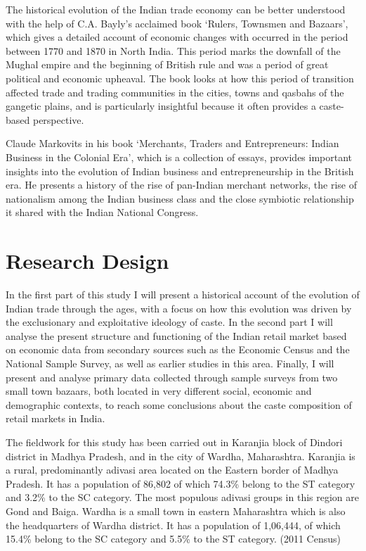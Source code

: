 \documentclass[12pt,a4paper,titlepage]{report}
\begin{document}
The historical evolution of the Indian trade economy can be better
understood with the help of C.A. Bayly's acclaimed book `Rulers,
Townsmen and Bazaars', which gives a detailed account of economic
changes with occurred in the period between 1770 and 1870 in North
India. This period marks the downfall of the Mughal empire and the
beginning of British rule and was a period of great political and
economic upheaval. The book looks at how this period of transition
affected trade and trading communities in the cities, towns and qasbahs
of the gangetic plains, and is particularly insightful because it often
provides a caste-based perspective.

Claude Markovits in his book `Merchants, Traders and Entrepreneurs:
Indian Business in the Colonial Era', which is a collection of essays,
provides important insights into the evolution of Indian business and
entrepreneurship in the British era. He presents a history of the rise
of pan-Indian merchant networks, the rise of nationalism among the
Indian business class and the close symbiotic relationship it shared
with the Indian National Congress.

\section{Research Design}\label{research-design}

In the first part of this study I will present a historical account of
the evolution of Indian trade through the ages, with a focus on how this
evolution was driven by the exclusionary and exploitative ideology of
caste. In the second part I will analyse the present structure and
functioning of the Indian retail market based on economic data from
secondary sources such as the Economic Census and the National Sample
Survey, as well as earlier studies in this area. Finally, I will present
and analyse primary data collected through sample surveys from two small
town bazaars, both located in very different social, economic and
demographic contexts, to reach some conclusions about the caste
composition of retail markets in India.

The fieldwork for this study has been carried out in Karanjia block of
Dindori district in Madhya Pradesh, and in the city of Wardha,
Maharashtra. Karanjia is a rural, predominantly adivasi area located on
the Eastern border of Madhya Pradesh. It has a population of 86,802 of
which 74.3\% belong to the ST category and 3.2\% to the SC category. The
most populous adivasi groups in this region are Gond and Baiga. Wardha
is a small town in eastern Maharashtra which is also the headquarters of
Wardha district. It has a population of 1,06,444, of which 15.4\% belong
to the SC category and 5.5\% to the ST category. (2011 Census)
\end{document}
